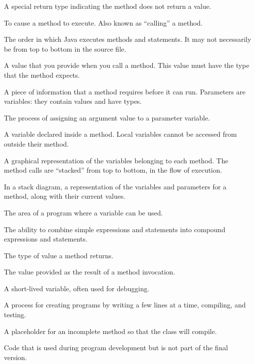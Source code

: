 \begin{description}


A special return type indicating the method does not return a value.

To cause a method to execute.
Also known as ``calling'' a method.

The order in which Java executes methods and statements.
It may not necessarily be from top to bottom in the source file.

A value that you provide when you call a method.
This value must have the type that the method expects.

A piece of information that a method requires before it can run.
Parameters are variables: they contain values and have types.

The process of assigning an argument value to a parameter variable.

A variable declared inside a method.
Local variables cannot be accessed from outside their method.

A graphical representation of the variables belonging to each method.
The method calls are ``stacked'' from top to bottom, in the flow of execution.

In a stack diagram, a representation of the variables and parameters for a method, along with their current values.

The area of a program where a variable can be used.

The ability to combine simple expressions and statements into compound expressions and statements.

The type of value a method returns.

The value provided as the result of a method invocation.

A short-lived variable, often used for debugging.

A process for creating programs by writing a few lines at a time, compiling, and testing.

A placeholder for an incomplete method so that the class will compile.

Code that is used during program development but is not part of the final version.

\end{description}


